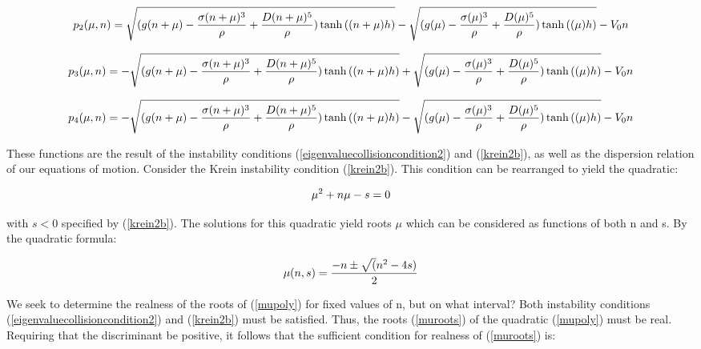 \documentclass{article}
\begin{document}
\begin{equation} \label{p2}
  \small{p_2(\mu,n) = \sqrt{(g(n+\mu) - \frac{\sigma(n+\mu)^3}{\rho} + \frac{D(n+\mu)^5}{\rho})\tanh{((n+\mu)h)}}   - \sqrt{(g(\mu) - \frac{\sigma(\mu)^3}{\rho} + \frac{D(\mu)^5}{\rho})\tanh{((\mu)h)}} - V_{0}n}
\\
\end{equation}

\begin{equation} \label{p3}
  \small{p_3(\mu,n) = - \sqrt{(g(n+\mu) - \frac{\sigma(n+\mu)^3}{\rho} + \frac{D(n+\mu)^5}{\rho})\tanh{((n+\mu)h)}}   + \sqrt{(g(\mu) - \frac{\sigma(\mu)^3}{\rho} + \frac{D(\mu)^5}{\rho})\tanh{((\mu)h)}} - V_{0}n}
\\
\end{equation}

\begin{equation} \label{p4}
  \small{p_4(\mu,n) = - \sqrt{(g(n+\mu) - \frac{\sigma(n+\mu)^3}{\rho} + \frac{D(n+\mu)^5}{\rho})\tanh{((n+\mu)h)}}   - \sqrt{(g(\mu) - \frac{\sigma(\mu)^3}{\rho} + \frac{D(\mu)^5}{\rho})\tanh{((\mu)h)}} - V_{0}n}
\\
\end{equation}

These functions are the result of the instability conditions (\ref{eigenvaluecollisioncondition2}) and (\ref{krein2b}), as well as the dispersion relation of our equations of motion. Consider the Krein instability condition (\ref{krein2b}). This condition can be rearranged to yield the quadratic:

 \begin{equation} \label{mupoly}
   \mu^2 + n \mu - s = 0 
\\
\end{equation}

with \(s<0\) specified by (\ref{krein2b}). The solutions for this quadratic yield roots \(\mu\) which can be considered as functions of both n and s. By the quadratic formula:

 \begin{equation} \label{muroots}
   \mu(n,s) = \frac{-n \pm \sqrt(n^2 - 4s)}{2}
\\
\end{equation}

We seek to determine the realness of the roots of (\ref{mupoly}) for fixed values of n, but on what interval? Both instability conditions (\ref{eigenvaluecollisioncondition2}) and (\ref{krein2b}) must be satisfied. Thus, the roots (\ref{muroots}) of the quadratic (\ref{mupoly}) must be real. Requiring that the discriminant be positive, it follows that the sufficient condition for realness of (\ref{muroots}) is:
\end{document}

